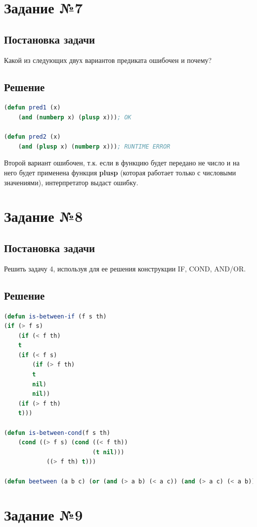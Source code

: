 \documentclass[12pt]{report}
\begin{document}
\section*{Задание №7}
\subsection*{Постановка задачи}
Какой из следующих двух вариантов предиката ошибочен и почему? 

\subsection*{Решение}
\begin{lstlisting}[label=7,caption=Решение задания №7, language=lisp]
(defun pred1 (x)
	(and (numberp x) (plusp x))); OK
	
(defun pred2 (x)
	(and (plusp x) (numberp x))); RUNTIME ERROR
\end{lstlisting}

Второй вариант ошибочен, т.к. если в функцию будет передано не число и на него будет применена функция \textbf{plusp} (которая работает только с числовыми значениями), интерпретатор выдаст ошибку.

\section*{Задание №8}
\subsection*{Постановка задачи}
Решить задачу 4, используя для ее решения конструкции IF, COND, AND/OR.

\subsection*{Решение}
\begin{lstlisting}[label=8,caption=Решение задания №8, language=lisp]
(defun is-between-if (f s th)
(if (> f s)
	(if (< f th)
	t
	(if (< f s)
		(if (> f th)
		t
		nil)
		nil))
	(if (> f th)
	t)))
	
(defun is-between-cond(f s th)
	(cond ((> f s) (cond ((< f th))
						 (t nil)))
		    ((> f th) t)))

(defun beetween (a b c) (or (and (> a b) (< a c)) (and (> a c) (< a b))))

\end{lstlisting}


\section*{Задание №9}
\end{document}
